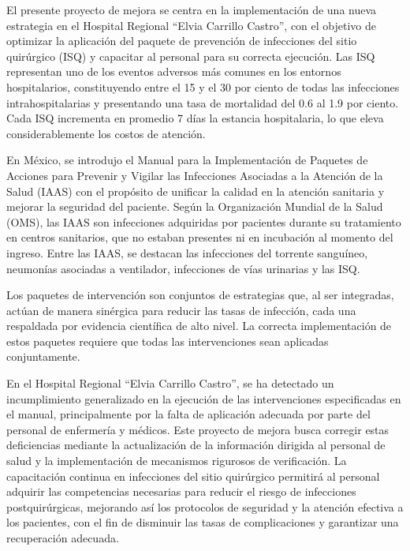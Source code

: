 	El presente proyecto de mejora se centra en la implementación de una nueva estrategia en el Hospital Regional ``Elvia Carrillo Castro'', con el objetivo de optimizar la aplicación del paquete de prevención de infecciones del sitio quirúrgico (ISQ) y capacitar al personal para su correcta ejecución. Las ISQ representan uno de los eventos adversos más comunes en los entornos hospitalarios, constituyendo entre el 15 y el 30 por ciento de todas las infecciones intrahospitalarias y presentando una tasa de mortalidad del 0.6 al 1.9 por ciento. Cada ISQ incrementa en promedio 7 días la estancia hospitalaria, lo que eleva considerablemente los costos de atención.

En México, se introdujo el Manual para la Implementación de Paquetes de Acciones para Prevenir y Vigilar las Infecciones Asociadas a la Atención de la Salud (IAAS) con el propósito de unificar la calidad en la atención sanitaria y mejorar la seguridad del paciente. Según la Organización Mundial de la Salud (OMS), las IAAS son infecciones adquiridas por pacientes durante su tratamiento en centros sanitarios, que no estaban presentes ni en incubación al momento del ingreso. Entre las IAAS, se destacan las infecciones del torrente sanguíneo, neumonías asociadas a ventilador, infecciones de vías urinarias y las ISQ.

Los paquetes de intervención son conjuntos de estrategias que, al ser integradas, actúan de manera sinérgica para reducir las tasas de infección, cada una respaldada por evidencia científica de alto nivel. La correcta implementación de estos paquetes requiere que todas las intervenciones sean aplicadas conjuntamente.

En el Hospital Regional ``Elvia Carrillo Castro'', se ha detectado un incumplimiento generalizado en la ejecución de las intervenciones especificadas en el manual, principalmente por la falta de aplicación adecuada por parte del personal de enfermería y médicos. Este proyecto de mejora busca corregir estas deficiencias mediante la actualización de la información dirigida al personal de salud y la implementación de mecanismos rigurosos de verificación. La capacitación continua en infecciones del sitio quirúrgico permitirá al personal adquirir las competencias necesarias para reducir el riesgo de infecciones postquirúrgicas, mejorando así los protocolos de seguridad y la atención efectiva a los pacientes, con el fin de disminuir las tasas de complicaciones y garantizar una recuperación adecuada.